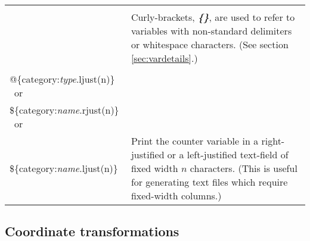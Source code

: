\documentclass[11pt]{article}
\begin{document}
\begin{longtable}[h]{l|p{11cm}}
\begin{tabular}[t]{l}
\textit{\$\textbf{\{}category:variable\textbf{\}}} \\
\end{tabular}
&
Curly-brackets, \textit{\textbf{\{\}}}, are used to refer to variables
with non-standard delimiters or whitespace characters.
(See section \ref{sec:vardetails}.)
\\
\hline
\begin{tabular}[t]{l}
@\{category:\textit{type}.rjust(n)\} \ or \\
@\{category:\textit{type}.ljust(n)\} \ or \\
\$\{category:\textit{name}.rjust(n)\} \ or \\
\$\{category:\textit{name}.ljust(n)\}
\end{tabular}
& 
Print the counter variable in a right-justified or a left-justified text-field 
of fixed width $n$ characters.
(This is useful for generating text files which require fixed-width columns.)
\\
\hline
\end{longtable}



\pagebreak


\subsection{Coordinate transformations}
\label{sec:xforms_table}
\end{document}
